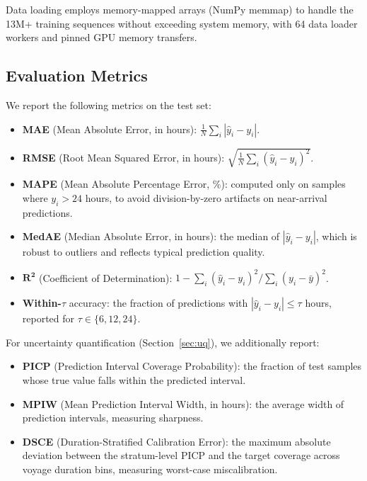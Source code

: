 \documentclass[conference]{IEEEtran}
\begin{document}
Data loading employs memory-mapped arrays (NumPy memmap) to handle the 13M+ training sequences without exceeding system memory, with 64 data loader workers and pinned GPU memory transfers.


\subsection{Evaluation Metrics}

We report the following metrics on the test set:

\begin{itemize}
    \item \textbf{MAE} (Mean Absolute Error, in hours): $\frac{1}{N}\sum_{i}|\hat{y}_i - y_i|$.
    \item \textbf{RMSE} (Root Mean Squared Error, in hours): $\sqrt{\frac{1}{N}\sum_{i}(\hat{y}_i - y_i)^2}$.
    \item \textbf{MAPE} (Mean Absolute Percentage Error, \%): computed only on samples where $y_i > 24$ hours, to avoid division-by-zero artifacts on near-arrival predictions.
    \item \textbf{MedAE} (Median Absolute Error, in hours): the median of $|\hat{y}_i - y_i|$, which is robust to outliers and reflects typical prediction quality.
    \item $\boldsymbol{R^2}$ (Coefficient of Determination): $1 - \sum_i(\hat{y}_i - y_i)^2 / \sum_i(y_i - \bar{y})^2$.
    \item \textbf{Within-$\tau$} accuracy: the fraction of predictions with $|\hat{y}_i - y_i| \leq \tau$ hours, reported for $\tau \in \{6, 12, 24\}$.
\end{itemize}

For uncertainty quantification (Section~\ref{sec:uq}), we additionally report:
\begin{itemize}
    \item \textbf{PICP} (Prediction Interval Coverage Probability): the fraction of test samples whose true value falls within the predicted interval.
    \item \textbf{MPIW} (Mean Prediction Interval Width, in hours): the average width of prediction intervals, measuring sharpness.
    \item \textbf{DSCE} (Duration-Stratified Calibration Error): the maximum absolute deviation between the stratum-level PICP and the target coverage across voyage duration bins, measuring worst-case miscalibration.
\end{itemize}
\end{document}
